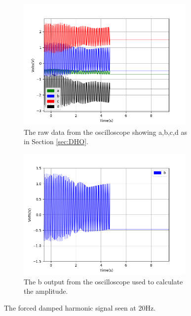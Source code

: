 \begin{figure}[h!]
\centering
\begin{subfigure}[t]{.475\textwidth}
  \centering
  \includegraphics[width=0.95\textwidth, height=0.20\textheight]{figures/FDHO/scope_44raw.png}
  \caption{The raw data from the oscilloscope showing a,b,c,d as in Section \ref{sec:DHO}.}
 \label{fig:FDHO_20Hz_raw}
\end{subfigure}\hfill
\begin{subfigure}[t]{.475\textwidth}
  \centering
  \includegraphics[width=0.95\textwidth, height=0.20\textheight]{figures/FDHO/scope_44v_2.png}
  \caption{The b output from the oscilloscope used to calculate the amplitude.}
\label{fig:FDHO_20Hz_b}
\end{subfigure}
\caption{The forced damped harmonic signal seen at 20Hz.}
\label{fig:FDHO_20Hz}
\end{figure}

